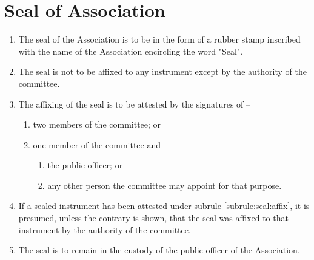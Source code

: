 \section{Seal of Association}
\label{rule:seal}

\begin{enumerate}
	\item The seal of the Association is to be in the form of a rubber stamp inscribed with the name of the Association encircling the word "Seal".
	\item The seal is not to be affixed to any instrument except by the authority of the committee.
	
	\item \label{subrule:seal:affix} The affixing of the seal is to be attested by the signatures of --
	\begin{enumerate}
		\item two members of the committee; or
		\item one member of the committee and --
		\begin{enumerate}
			\item the public officer; or
			\item any other person the committee may appoint for that purpose.
		\end{enumerate}
	\end{enumerate}
	
	\item If a sealed instrument has been attested under subrule \ref{subrule:seal:affix}, it is presumed, unless the contrary is shown, that the seal was affixed to that instrument by the authority of the committee.
	\item The seal is to remain in the custody of the public officer of the Association.
\end{enumerate}